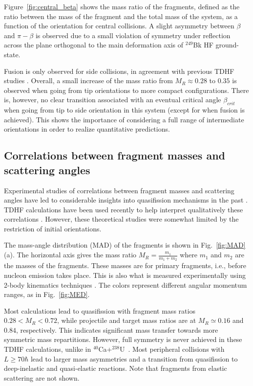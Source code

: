 \documentclass[reprint,aps,prc,twocolumn,floatfix,10pt]{revtex4-2}
\begin{document}
Figure~\ref{fig:central_beta} shows the mass ratio of the fragments, defined as the ratio between the mass of the fragment and the total mass of the system, as a function of the orientation for central collisions.
A slight asymmetry between $\beta$ and $\pi-\beta$ is observed due to a small violation of symmetry under reflection across the plane orthogonal to the main deformation axis of  $^{249}$Bk HF ground-state.

Fusion is only observed for side collisions, in agreement with previous TDHF studies \cite{wakhle2014,oberacker2014,umar2016}.
Overall, a small increase of the mass ratio from $M_R\approx0.28$ to $0.35$ is observed when going from tip orientations to more compact configurations.
There is, however, no clear transition associated with an eventual critical angle $\beta_{crit}$ when going from tip to side orientation in this system (except for when fusion is achieved).
This shows the importance of considering a full range of intermediate orientations in order to realize quantitative predictions.

\subsection{Correlations between fragment masses and scattering angles}\label{sec:MAD}

Experimental studies of correlations between fragment masses and scattering angles have led to considerable insights into quasifission mechanisms in the past \cite{toke1985,shen1987,hinde2008,simenel2012b,durietz2013,wakhle2014,hammerton2015,morjean2017,mohanto2018,hinde2018}.
TDHF calculations have been used recently to help interpret qualitatively these correlations \cite{wakhle2014,hammerton2015,umar2016,sekizawa2016}.
However, these theoretical studies were somewhat limited by the restriction of initial orientations.

The mass-angle distribution (MAD) of the fragments is shown in Fig.~\ref{fig:MAD}(a).
The horizontal axis gives the mass ratio $M_R=\frac{m_1}{m_1+m_2}$ where $m_1$ and $m_2$ are the masses of the fragments.
These masses are for primary fragments, i.e., before nucleon emission takes place.
This is also what is measured experimentally using 2-body kinematics techniques \cite{toke1985,hinde1996}.
The colors represent different angular momentum ranges, as in Fig.~\ref{fig:MED}.

Most calculations lead to quasifission with fragment mass ratios $0.28<M_R<0.72$, while projectile and target mass ratios are at $M_R\simeq0.16$ and $0.84$, respectively.
This indicates significant mass transfer towards more symmetric mass repartitions. However, full symmetry is never achieved in these TDHF calculations, unlike in $^{40}$Ca$+^{238}$U~\cite{wakhle2014}.
Most peripheral collisions with $L\ge70\hbar$ lead to larger mass asymmetries and a transition from quasifission to deep-inelastic and quasi-elastic reactions.
Note that fragments from elastic scattering are not shown.
\end{document}
